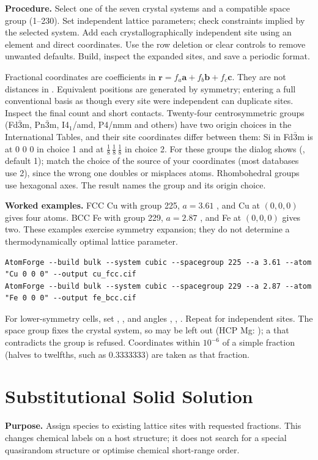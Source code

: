 \textbf{Procedure.} Select one of the seven crystal systems and a compatible space group (1--230). Set independent lattice parameters; check constraints implied by the selected system. Add each crystallographically independent site using an element and direct coordinates. Use the row deletion or clear controls to remove unwanted defaults. Build, inspect the expanded sites, and save a periodic format.

Fractional coordinates are coefficients in $\mathbf r=f_a\mathbf a+f_b\mathbf b+f_c\mathbf c$. They are not distances in \angstrom. Equivalent positions are generated by symmetry; entering a full conventional basis as though every site were independent can duplicate sites. Inspect the final count and short contacts. Twenty-four centrosymmetric groups (Fd$\bar3$m, Pn$\bar3$m, I4$_1$/amd, P4/nmm and others) have two origin choices in the International Tables, and their site coordinates differ between them: Si in Fd$\bar3$m is at 0 0 0 in choice 1 and at $\tfrac18\,\tfrac18\,\tfrac18$ in choice 2. For these groups the dialog shows  (, default 1); match the choice of the source of your coordinates (most databases use 2), since the wrong one doubles or misplaces atoms. Rhombohedral groups use hexagonal axes. The result names the group and its origin choice.

\textbf{Worked examples.} FCC Cu with group 225, $a=3.61$ \angstrom, and Cu at $(0,0,0)$ gives four atoms. BCC Fe with group 229, $a=2.87$ \angstrom, and Fe at $(0,0,0)$ gives two. These examples exercise symmetry expansion; they do not determine a thermodynamically optimal lattice parameter.
\begin{lstlisting}
AtomForge --build bulk --system cubic --spacegroup 225 --a 3.61 --atom "Cu 0 0 0" --output cu_fcc.cif
AtomForge --build bulk --system cubic --spacegroup 229 --a 2.87 --atom "Fe 0 0 0" --output fe_bcc.cif
\end{lstlisting}
For lower-symmetry cells, set , , and angles , , . Repeat  for independent sites. The space group fixes the crystal system, so  may be left out (HCP Mg:  ); a  that contradicts the group is refused. Coordinates within $10^{-6}$ of a simple fraction (halves to twelfths, such as 0.3333333) are taken as that fraction.

\section{Substitutional Solid Solution}
\textbf{Purpose.} Assign species to existing lattice sites with requested fractions. This changes chemical labels on a host structure; it does not search for a special quasirandom structure or optimise chemical short-range order.

